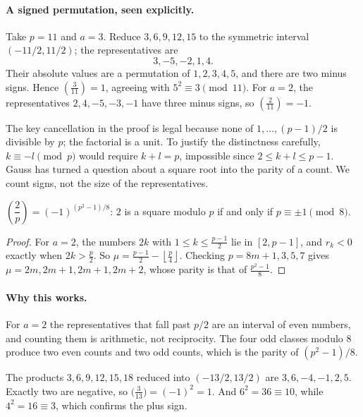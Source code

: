 \paragraph{A signed permutation, seen explicitly.}
Take $p=11$ and $a=3$. Reduce $3,6,9,12,15$ to the symmetric interval
$(-11/2,11/2)$; the representatives are
\[
 3,-5,-2,1,4.
\]
Their absolute values are a permutation of $1,2,3,4,5$, and there are two
minus signs. Hence $\left(\frac3{11}\right)=1$, agreeing with
$5^2\equiv3\pmod{11}$. For $a=2$, the representatives
$2,4,-5,-3,-1$ have three minus signs, so
$\left(\frac2{11}\right)=-1$.

The key cancellation in the proof is legal because none of
$1,\dots,(p-1)/2$ is divisible by $p$; the factorial is a unit.
To justify the distinctness carefully, $k\equiv-l\pmod p$ would require
$k+l=p$, impossible since $2\le k+l\le p-1$.
Gauss has turned a question about a square root into the parity of a count.
We count signs, not the size of the representatives.

\begin{corollary}\label{cor:two}
$\left(\dfrac2p\right)=(-1)^{(p^2-1)/8}$: $2$ is a square modulo $p$ if and only if $p\equiv\pm1\pmod8$.
\end{corollary}
\begin{proof}
For $a=2$, the numbers $2k$ with $1\le k\le\frac{p-1}2$ lie in $[2,p-1]$, and $r_k<0$ exactly when $2k>\frac p2$. So $\mu=\frac{p-1}2-\left\lfloor\frac p4\right\rfloor$. Checking $p=8m+1,3,5,7$ gives $\mu=2m,2m+1,2m+1,2m+2$, whose parity is that of $\frac{p^2-1}8$.
\end{proof}

\paragraph{Why this works.}
For $a=2$ the representatives that fall past $p/2$ are an interval of even numbers, and counting them is arithmetic, not reciprocity. The four odd classes modulo $8$ produce two even counts and two odd counts, which is the parity of $(p^2-1)/8$.

\begin{examplex}[Gauss's count for $a=3$, $p=13$]
The products $3,6,9,12,15,18$ reduced into $(-13/2,13/2)$ are $3,6,-4,-1,2,5$.
Exactly two are negative, so $\bigl(\frac{3}{13}\bigr)=(-1)^2=1$.
And $6^2=36\equiv 10$, while $4^2=16\equiv 3$, which confirms the plus sign.
\end{examplex}

